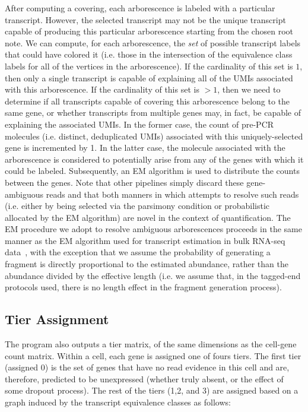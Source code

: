 After computing a covering, each arborescence is labeled with a particular transcript.  However, the selected transcript may not be the unique transcript capable of producing this particular arborescence starting from the chosen root note.  We can compute, for each arborescence, the \emph{set} of possible transcript labels that could have colored it (i.e. those in the intersection of the equivalence class labels for all of the vertices in the arborescence).  If the cardinality of this set is $1$, then only a single transcript is capable of explaining all of the UMIs associated with this arborescence.  If the cardinality of this set is $>1$, then we need to determine if all transcripts capable of covering this arborescence belong to the same gene, or whether transcripts from multiple genes may, in fact, be capable of explaining the associated UMIs. In the former case, the count of pre-PCR molecules (i.e. distinct, deduplicated UMIs) associated with this uniquely-selected gene is incremented by 1. In the latter case, the molecule associated with the arborescence is considered to potentially arise from any of the genes with which it could be labeled. Subsequently, an EM algorithm is used to distribute the counts between the genes. Note that other pipelines simply discard these gene-ambiguous reads and that both manners in which \alevin attempts to resolve such reads (i.e. either by being selected via the parsimony condition or probabilistic allocated by the EM algorithm) are novel in the context of \scrnaseq quantification. The EM procedure we adopt to resolve ambiguous arborescences proceeds in the same manner as the EM algorithm used for transcript estimation in bulk RNA-seq data~\citep{salmon}, with the exception that we assume the probability of generating a fragment is directly proportional to the estimated abundance, rather than the abundance divided by the effective length (i.e. we assume that, in the tagged-end protocols used, there is no length effect in the fragment generation process).

\subsection{Tier Assignment}
\label{sec:tier_algo}
The \alevin program also outputs a tier matrix, of the same dimensions as the cell-gene count matrix. Within a cell, each gene is assigned one of fours tiers. The first tier (assigned 0) is the set of genes that have no read evidence in this cell and are, therefore, predicted to be unexpressed (whether truly absent, or the effect of some dropout process). The rest of the tiers (1,2, and 3) are assigned based on a graph induced by the transcript equivalence classes as follows:

